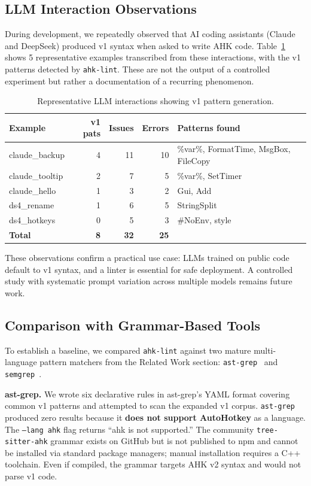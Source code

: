 \documentclass[11pt,a4paper]{article}
\begin{document}
\subsection{LLM Interaction Observations}

During development, we repeatedly observed that AI coding assistants (Claude and DeepSeek) produced v1 syntax when asked to write AHK code. Table~\ref{tab:llm} shows 5 representative examples transcribed from these interactions, with the v1 patterns detected by \texttt{ahk-lint}. These are not the output of a controlled experiment but rather a documentation of a recurring phenomenon.

\begin{table}[h]
\centering\small
\caption{Representative LLM interactions showing v1 pattern generation.}
\label{tab:llm}
\begin{tabular}{lrrrl}
\toprule
\textbf{Example} & \textbf{v1 pats} & \textbf{Issues} & \textbf{Errors} & \textbf{Patterns found} \\
\midrule
claude\_backup & 4 & 11 & 10 & \%var\%, FormatTime, MsgBox, FileCopy \\
claude\_tooltip & 2 & 7 & 5 & \%var\%, SetTimer \\
claude\_hello & 1 & 3 & 2 & Gui, Add \\
ds4\_rename & 1 & 6 & 5 & StringSplit \\
ds4\_hotkeys & 0 & 5 & 3 & \#NoEnv, style \\
\midrule
\textbf{Total} & \textbf{8} & \textbf{32} & \textbf{25} & \\
\bottomrule
\end{tabular}
\end{table}

These observations confirm a practical use case: LLMs trained on public code default to v1 syntax, and a linter is essential for safe deployment. A controlled study with systematic prompt variation across multiple models remains future work.

\subsection{Comparison with Grammar-Based Tools}

To establish a baseline, we compared \texttt{ahk-lint} against two mature multi-language pattern matchers from the Related Work section: \texttt{ast-grep}~\cite{astgrep} and \texttt{semgrep}~\cite{semgrep}.

\textbf{ast-grep.} We wrote six declarative rules in ast-grep's YAML format covering common v1 patterns and attempted to scan the expanded v1 corpus. \texttt{ast-grep} produced zero results because it \textbf{does not support AutoHotkey} as a language. The \texttt{--lang ahk} flag returns ``ahk is not supported.'' The community \texttt{tree-sitter-ahk} grammar exists on GitHub but is not published to npm and cannot be installed via standard package managers; manual installation requires a C++ toolchain. Even if compiled, the grammar targets AHK v2 syntax and would not parse v1 code.
\end{document}
